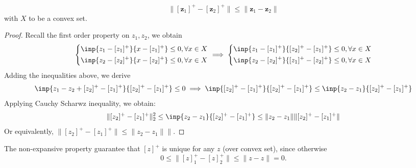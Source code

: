 \begin{proposition}
\[
\|[\bm z_1]^+ - [\bm z_2]^+\|\le\|\bm z_1-\bm z_2\|
\]
with $X$ to be a convex set.
\end{proposition}
\begin{proof}
Recall the first order property on $z_1,z_2$, we obtain
\[
\left\{
\begin{aligned}
\inp{z_1-[z_1]^+}{x-[z_1]^+}&\le0,\forall x\in X\\
\inp{z_2-[z_2]^+}{x-[z_2]^+}&\le0,\forall x\in X
\end{aligned}
\right.\implies
\left\{
\begin{aligned}
\inp{z_1-[z_1]^+}{[z_2]^+-[z_1]^+}&\le0,\forall x\in X\\
\inp{z_2-[z_2]^+}{[z_1]^+-[z_2]^+}&\le0,\forall x\in X
\end{aligned}
\right.
\]
Adding the inequalities above, we derive
\[
\inp{z_1-z_2+[z_2]^+-[z_1]^+}{[z_2]^+-[z_1]^+}\le0
\implies
\inp{[z_2]^+-[z_1]^+}{[z_2]^+-[z_1]^+}\le
\inp{z_2-z_1}{[z_2]^+-[z_1]^+}
\]
Applying Cauchy Scharwz inequality, we obtain:
\[
\|[z_2]^+-[z_1]^+\|_2^2\le \inp{z_2-z_1}{[z_2]^+-[z_1]^+}\le
\|z_2-z_1\|\|[z_2]^+-[z_1]^+\|
\]
Or equivalently, $\|[z_2]^+-[z_1]^+\|\le \|z_2-z_1\|\|$.
\end{proof}
\begin{remark}
The non-expansive property guarantee that $[z]^+$ is unique for any $z$ (over convex set), since otherwise
\[
0\le\|[z]^+_1-[z]^+_2\|\le\|z-z\|=0.
\]
\end{remark}


